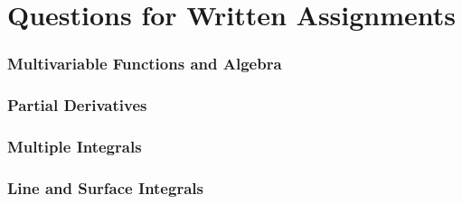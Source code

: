 \documentclass{article}
\begin{document}
\maketitle  %
\newpage
\tableofcontents
\newpage
\part{Questions for Written Assignments}
\setcounter{section}{1}
\section{Multivariable Functions and Algebra}
\newpage %
\section{Partial Derivatives} %
\newpage %
\section{Multiple Integrals}





\newpage
\section{Line and Surface Integrals}
\newpage

\newpage
\end{document}
